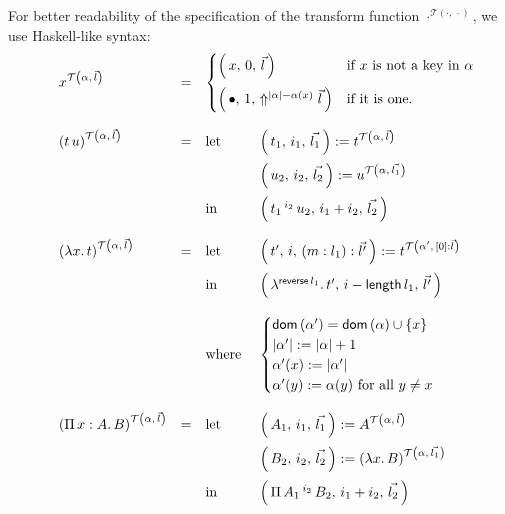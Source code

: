\documentclass[12pt, a4paper, titlepage]{article}
\newcommand{\ovar}{\mathord{\bullet}}
\newcommand{\sspace}{\,}
\newcommand{\la}{\lambda}
\newcommand{\ve}[1]{[#1]}
\newcommand{\dom}[1]{\mathsf{dom}\left(#1\right)}
\newcommand{\ApA}[2]{#1 \sspace #2}
\newcommand{\LaA}[2]{\la {#1}. \sspace #2}
\newcommand{\PiA}[3]{\Pi \sspace #1:#2 . \sspace #3}
\newcommand{\ApO}[3]{#1 \sspace ^{#2} \sspace #3}
\newcommand{\LaO}[2]{\la ^{#1} . \sspace #2}
\newcommand{\PiO}[3]{\Pi \sspace #1 \sspace ^{#2} \sspace #3}
\newcommand{\transO}[3]{ {#1}^{\mathcal{T}\left({#2}, \sspace {#3}\right)}}
\newcommand{\upch}[1]{\Uparrow^{#1}}
\newcommand{\result}[3]{\left( \, {#1}, \sspace {#2}, \sspace {#3} \, \right)}
\begin{document}
For better readability of the specification of the transform function $\transO{\cdot}{\cdot}{\cdot}$, we use Haskell-like syntax:
\[ 
\begin{array}{lllll}
& \transO{x}{\alpha}{\vec l} & = & 
\multicolumn{2}{l}{
\begin{cases} 
\result x 0 {\vec l} & \text{if $x$ is not a key in $\alpha$} \\ 
\noalign{\medskip}
\result {\ovar} 1 {\upch {|\alpha| - \alpha(x)} {\vec l}} & \text{if it is one.}  
\end{cases}
}\\ \\
& \transO{\left(\ApA t u\right)}{\alpha}{\vec l} & = & \mbox{let } &\result{t_1}{i_1}{\vec{l_1}} := \transO{t}{\alpha}{\vec l} \\
\noalign{\medskip}
				      &&&             &\result{u_2}{i_2}{\vec{l_2}} := \transO{u}{\alpha}{\vec{l_1}} \\
\noalign{\medskip}
				      &&& \mbox{in }  &\result{\ApO {t_1} {i_2} {u_2}}{i_1 + i_2}{\vec {l_2}}
\\
\\
& \transO{\left(\LaA x t\right)}{\alpha}{\vec l} & = &  \mbox{let } &\result{t'}{i}{(m : l_1) : \vec{l'}} := \transO{t}{\alpha'}{\ve 0 : \vec l} \\
\noalign{\medskip}
				      &&& \mbox{in }  &\result{\LaO {\mathsf{reverse} \, l_1} {t'}}{i - \mathsf{length}\, l_1}{\vec {l'}}
\\ \\
				      &&& \mbox{where }  &\begin{cases}
							   \dom{\alpha'} = \dom{\alpha} \cup \{ x \} \\
							   |\alpha'| := |\alpha| + 1 \\
				                           \alpha'(x) := |\alpha'| \\
				                           \alpha'(y) := \alpha(y) \mbox{ for all } y \not=x  
				                          \end{cases}
\\
\\
& \transO{\left( \PiA {x} A B\right)}{\alpha}{\vec l} & = & \mbox{let } &\result{A_1}{i_1}{\vec{l_1}} := \transO{A}{\alpha}{\vec l} \\
\noalign{\medskip}
				      &&&             &\result{B_2}{i_2}{\vec{l_2}} := \transO{\left(\LaA x B\right)}{\alpha}{\vec{l_1}} \\
\noalign{\medskip}
				      &&& \mbox{in }  &\result{\PiO {A_1} {i_2} {B_2}}{i_1 + i_2}{\vec {l_2}}

\end{array}\]
\end{document}
